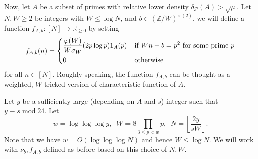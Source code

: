\documentclass[11pt]{amsart}
\theoremstyle{plain} %
\theoremstyle{remark}
\numberwithin{equation}{section}
\newcommand{\R}{\mathbb{R}}
\newcommand{\Z}{\mathbb{Z}}
\begin{document}
Now, let $A$ be a subset of primes with relative lower density $\delta_{\mathcal{P}}(A)>\sqrt{\mu}$. Let $N,W\geq 2$ be integers with $W\leq \log N$, and $b\in (\Z/W)^{\times(2)}$, we will define a function $f_{A,b}:[N]\longrightarrow\R_{\geq 0}$ by setting
\begin{equation*}
    f_{A,b}(n)=\begin{dcases}
        \frac{\varphi(W)}{W\sigma_W}(2p\log p)1_{A}(p)&\text{if $Wn+b=p^2$ for some prime $p$}\\
        0&\text{otherwise}
    \end{dcases}
\end{equation*}
for all $n\in [N]$. Roughly speaking, the function $f_{A,b}$ can be thought as a weighted, $W$-tricked version of characteristic function of $A$.

Let $y$ be a sufficiently large (depending on $A$ and $s$) integer such that $y\equiv s\;\mathrm{mod}\;24$. Let
\begin{equation*}
    w=\log\log\log y,\;\;W=8\prod_{3\leq p<w}p,\;\;N=\left\lfloor\frac{2y}{sW}\right\rfloor .
\end{equation*}
Note that we have $w=O(\log\log\log N)$ and hence $W\leq \log N$. We will work with $\nu_b,f_{A,b}$ defined as before based on this choice of $N,W$.
\end{document}
